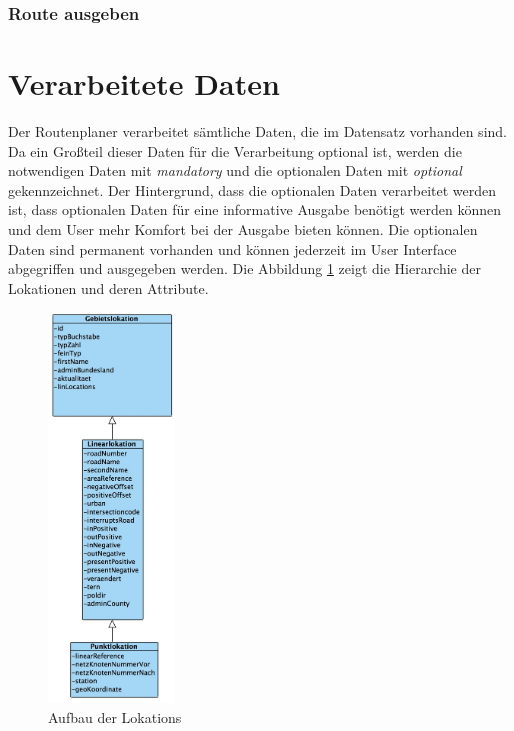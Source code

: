 \documentclass[12pt, a4paper, ngerman]{article}
\begin{document}
\subsubsection{Route ausgeben \label{uc:RouteAusgeben}}
\begin{usecase}
\end{usecase}

\section{Verarbeitete Daten}
Der Routenplaner verarbeitet sämtliche Daten, die im Datensatz vorhanden sind. Da ein Großteil dieser Daten für die Verarbeitung optional ist, werden die notwendigen Daten mit \textit{mandatory} und die optionalen Daten mit \textit{optional} gekennzeichnet. Der Hintergrund, dass die optionalen Daten verarbeitet werden ist, dass optionalen Daten für eine informative Ausgabe benötigt werden können und dem User mehr Komfort bei der Ausgabe bieten können. Die optionalen Daten sind permanent vorhanden und können jederzeit im User Interface abgegriffen und ausgegeben werden.
Die Abbildung \ref{fig:klassendiagrammLokations} zeigt die Hierarchie der Lokationen und deren Attribute.

\begin{figure}[htbp] 
  \centering
     \includegraphics[width=0.3\textwidth]{Grafiken/klassenDiagrammLokations.jpg}
  \caption{Aufbau der Lokations}
  \label{fig:klassendiagrammLokations}
\end{figure}
\end{document}
